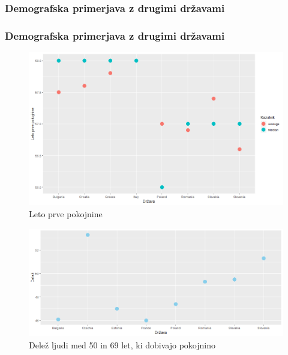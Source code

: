 \documentclass[10pt]{beamer}
\begin{document}
\begin{frame}
\subsubsection[Demografska primerjava z drugimi državami]{Demografska primerjava z drugimi državami}
\frametitle{Demografska primerjava z drugimi državami}
\begin{figure}[h]
\centering
\includegraphics[height = 7 cm]{leto_prve_pokojnine.png}
\caption{Leto prve pokojnine}
\label{Slika 4}
\end{figure}
\end{frame}

\begin{frame}

\begin{figure}[h!]
\centering
\includegraphics[width = 10 cm]{graf_procentualno_pokojnina.png}
\caption{Delež ljudi med 50 in 69 let, ki dobivajo pokojnino}
\label{Slika 5}
\end{figure}
\end{frame}
\end{document}

